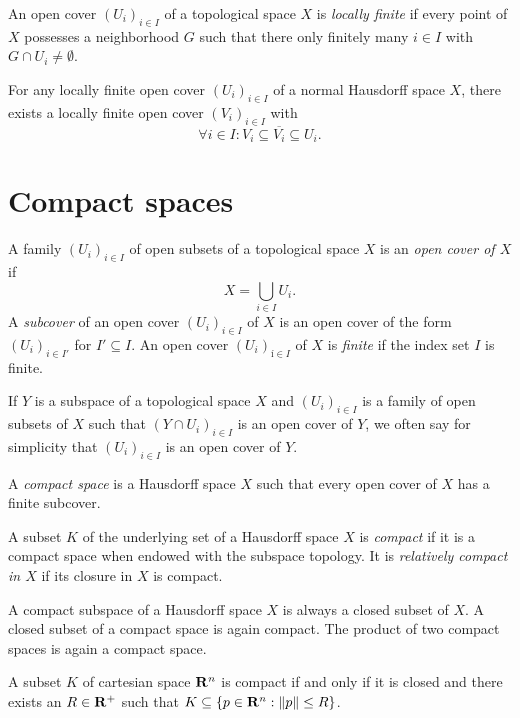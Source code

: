 An open cover $(U_i)_{i \in I}$ of a topological space $X$ is \emph{locally finite}
if every point of $X$ possesses a neighborhood $G$ such that there only finitely
many $i \in I$ with $G \cap U_i \neq \emptyset$.
\begin{thm}
  \label{prop:shrinking_lemma}
  For any locally finite open cover $(U_i)_{i \in I}$ of a normal Hausdorff space $X$, there
  exists a locally finite open cover $(V_i)_{i \in I}$ with
  \[
    \forall i \in I : V_i \subseteq \overline{V_i} \subseteq U_i.
  \]
\end{thm}

\section{Compact spaces}
\label{sec:compact}

A family $(U_i)_{i \in I}$ of open subsets of a topological space $X$ is an
\emph{open cover of $X$} if
\[
  X = \bigcup_{i \in I} U_i.
\]
A \emph{subcover} of an open cover $(U_i)_{i \in I}$ of $X$
is an open cover of the form $(U_i)_{i \in I'}$ for $I' \subseteq I$. An open
cover $(U_i)_{í \in I}$ of $X$ is \emph{finite} if the index set $I$ is finite.

If $Y$ is a subspace of a topological space $X$ and $(U_i)_{i \in I}$ is a family
of open subsets of $X$ such that $(Y \cap U_i)_{i \in I}$ is an open cover of
$Y$, we often say for simplicity that $(U_i)_{i \in I}$ is an open cover of $Y$.

\begin{dfn}
  A \emph{compact space} is a Hausdorff space $X$ such that every open cover of
  $X$ has a finite subcover.
\end{dfn}

A subset $K$ of the underlying set of a Hausdorff space $X$ is \emph{compact}
if it is a compact space when endowed with the subspace topology. It is \emph{relatively
compact in $X$} if its closure in $X$ is compact.

A compact subspace of a Hausdorff space $X$ is always a closed subset of $X$. A closed
subset of a compact space is again compact. The product of two compact spaces
is again a compact space.

\begin{thm}
  A subset $K$ of cartesian space $\mathbf{R}^n$ is compact if and only if it is closed
  and there exists an $R \in \mathbf{R}^+$ such that $K \subseteq \lbrace p \in \mathbf{R}^n : \lVert p\rVert \leq R\rbrace$.
\end{thm}

